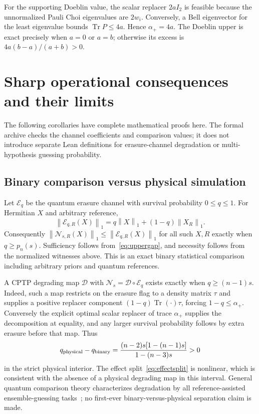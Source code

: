 \documentclass[11pt,a4paper]{article}
\newcommand{\Tr}{\operatorname{Tr}}
\newcommand{\cN}{\mathcal N}
\newcommand{\cD}{\mathcal D}
\newcommand{\cE}{\mathcal E}
\newcommand{\norm}[1]{\left\lVert#1\right\rVert}
\begin{document}
For the supporting Doeblin value, the scalar replacer $2aI_2$ is feasible because the unnormalized Pauli Choi eigenvalues are $2w_i$. Conversely, a Bell eigenvector for the least eigenvalue bounds $\Tr P\le4a$. Hence $\alpha_+=4a$. The Doeblin upper is exact precisely when $a=0$ or $a=b$; otherwise its excess is $4a(b-a)/(a+b)>0$.

\section{Sharp operational consequences and their limits}\label{sec:operational}
The following corollaries have complete mathematical proofs here. The formal archive checks the channel coefficients and comparison values; it does not introduce separate Lean definitions for erasure-channel degradation or multi-hypothesis guessing probability.

\subsection{Binary comparison versus physical simulation}
Let $\cE_q$ be the quantum erasure channel with survival probability $0\le q\le1$. For Hermitian $X$ and arbitrary reference,
\[
 \norm{\cE_{q,R}(X)}_1=q\norm X_1+(1-q)\norm{X_R}_1.
\]
Consequently $\norm{\cN_{s,R}(X)}_1\le\norm{\cE_{q,R}(X)}_1$ for all such $X,R$ exactly when $q\ge p_n(s)$. Sufficiency follows from~\eqref{eq:uppergap}, and necessity follows from the normalized witnesses above. This is an exact binary statistical comparison including arbitrary priors and quantum references.

A CPTP degrading map $\cD$ with $\cN_s=\cD\circ\cE_q$ exists exactly when $q\ge(n-1)s$. Indeed, such a map restricts on the erasure flag to a density matrix $\tau$ and supplies a positive replacer component $(1-q)\Tr(\cdot)\tau$, forcing $1-q\le\alpha_+$. Conversely the explicit optimal scalar replacer of trace $\alpha_+$ supplies the decomposition at equality, and any larger survival probability follows by extra erasure before that map. Thus
\[
 q_{\rm physical}-q_{\rm binary}
 =\frac{(n-2)s[1-(n-1)s]}{1-(n-3)s}>0
\]
in the strict physical interior. The effect split~\eqref{eq:effectsplit} is nonlinear, which is consistent with the absence of a physical degrading map in this interval. General quantum comparison theory characterizes degradation by all reference-assisted ensemble-guessing tasks~\cite[Theorem 1, zero-error case]{Jencova}; no first-ever binary-versus-physical separation claim is made.
\end{document}
